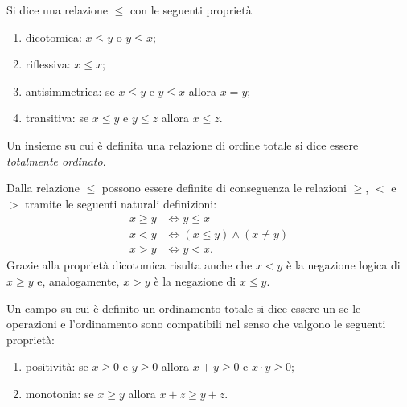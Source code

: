 \begin{definition}
\label{def:order}
Si dice 
una relazione $\le$ con le seguenti proprietà
\mymargin{$\le$}
\begin{enumerate}
\item dicotomica: $x \le y$ o $y \le x$;
\item riflessiva: $x \le x$;
\item antisimmetrica: se $ x\le y$ e $y \le x$ allora $x=y$;
\item transitiva: se $x\le y $ e $ y \le z$ allora $x\le z$.
\end{enumerate}
Un insieme su cui è definita una relazione di
ordine totale si dice essere \emph{totalmente ordinato}.
\end{definition}

Dalla relazione $\le$ possono essere definite di conseguenza
le relazioni $\ge$, $<$ e $>$ tramite le seguenti naturali definizioni:
\mymargin{$\ge$ $<$ $>$}%
\begin{align*}
  x \ge y &\iff y \le x \\
  x < y & \iff (x\le y) \land (x \neq y)\\
  x > y & \iff y< x.
\end{align*}
Grazie alla proprietà dicotomica risulta anche che
$x<y$ è la negazione logica di $x \ge y$ e, analogamente,
$x>y$ è la negazione di $x \le y$.

\begin{definition}
\label{def:campo_ordinato}%
Un campo su cui è definito un ordinamento totale
si dice essere un 
se le operazioni e l'ordinamento sono compatibili
nel senso che
valgono le seguenti proprietà:
\begin{enumerate}
\item positività: se $x\ge 0$ e $y \ge 0$ allora $x+y \ge 0$ e $x\cdot y\ge 0$;
\item monotonia: se $x \ge y$ allora $x+z \ge y+z$.
\end{enumerate}
\end{definition}

